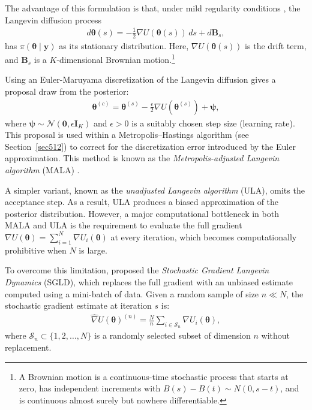 The advantage of this formulation is that, under mild regularity conditions \cite{roberts1996exponential}, the Langevin diffusion process
\begin{align*}
	d\boldsymbol{\theta}(s) = -\frac{1}{2} \nabla U(\boldsymbol{\theta}(s))\,ds + d\mathbf{B}_s,
\end{align*}
has \( \pi(\boldsymbol{\theta} \mid \mathbf{y}) \) as its stationary distribution. Here, \( \nabla U(\boldsymbol{\theta}(s)) \) is the drift term, and \( \mathbf{B}_s \) is a \( K \)-dimensional Brownian motion.\footnote{A Brownian motion is a continuous-time stochastic process that starts at zero, has independent increments with \( B(s) - B(t) \sim {N}(0, s - t) \), and is continuous almost surely but nowhere differentiable.}

Using an Euler-Maruyama discretization of the Langevin diffusion gives a proposal draw from the posterior:
\begin{align*}
	\boldsymbol{\theta}^{(c)} = \boldsymbol{\theta}^{(s)} - \frac{\epsilon}{2} \nabla U(\boldsymbol{\theta}^{(s)}) + \boldsymbol{\psi},
\end{align*}
where \( \boldsymbol{\psi} \sim \mathcal{N}(\mathbf{0}, \epsilon \mathbf{I}_K) \) and \( \epsilon > 0 \) is a suitably chosen step size (learning rate). This proposal is used within a Metropolis–Hastings algorithm (see Section~\ref{sec512}) to correct for the discretization error introduced by the Euler approximation. This method is known as the \textit{Metropolis-adjusted Langevin algorithm} (MALA) \cite{roberts1996exponential}. 

A simpler variant, known as the \textit{unadjusted Langevin algorithm} (ULA), omits the acceptance step. As a result, ULA produces a biased approximation of the posterior distribution. However, a major computational bottleneck in both MALA and ULA is the requirement to evaluate the full gradient \( \nabla U(\boldsymbol{\theta}) = \sum_{i=1}^N \nabla U_i(\boldsymbol{\theta}) \) at every iteration, which becomes computationally prohibitive when \( N \) is large.

To overcome this limitation, \cite{welling2011bayesian} proposed the \textit{Stochastic Gradient Langevin Dynamics} (SGLD), which replaces the full gradient with an unbiased estimate computed using a mini-batch of data. Given a random sample of size \( n \ll N \), the stochastic gradient estimate at iteration \( s \) is:
\begin{align} \label{eq:grad}
	\hat{\nabla} U(\boldsymbol{\theta})^{(n)} = \frac{N}{n} \sum_{i \in \mathcal{S}_n} \nabla U_i(\boldsymbol{\theta}),
\end{align}
where \( \mathcal{S}_n \subset \{1, 2, \dots, N\} \) is a randomly selected subset of dimension $n$ without replacement.

